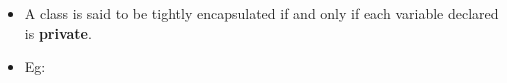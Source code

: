\setlength{\columnsep}{3pt}
\begin{flushleft}
	
	\begin{itemize}
		\item A class is said to be tightly encapsulated if and only if each variable declared is \textbf{private}.
		\item Eg:
	
	\end{itemize}	
	
\end{flushleft}
